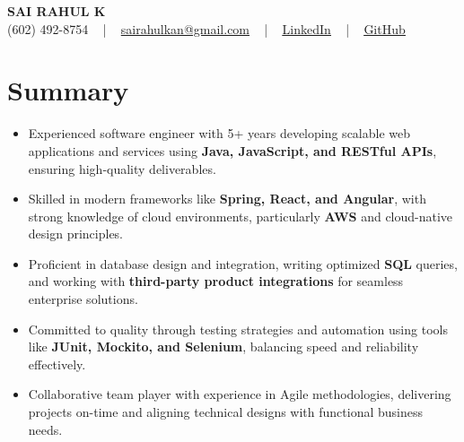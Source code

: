 \documentclass[letterpaper,11pt]{article}
\newcommand{\resumeItem}[1]{
  \item\footnotesize{
    {#1 \vspace{-2pt}}
  }
}
\newcommand{\resumeItemListStart}{\begin{itemize}[leftmargin=*]}
\newcommand{\resumeItemListEnd}{\end{itemize}\vspace{-5pt}}
\begin{document}
\begin{center}
    {\fontsize{14pt}{12pt}\selectfont \textbf{\MakeUppercase{Sai Rahul K}}}\\ \vspace{2pt}
    \fontsize{10pt}{12pt}\selectfont (602) 492-8754 ~ | ~ \href{mailto:sairahulkan@gmail.com}{sairahulkan@gmail.com} ~ | ~
    \href{https://www.linkedin.com/in/rq123/}{\color{blue}\underline{LinkedIn}} ~ | ~
    \href{https://github.com/kanrahuldo}{\color{blue}\underline{GitHub}}~
    \vspace{-8pt}
\end{center}

\section{Summary}
\fontsize{9pt}{10pt}\selectfont
\resumeItemListStart
    \resumeItem{Experienced software engineer with 5+ years developing scalable web applications and services using \textbf{Java, JavaScript, and RESTful APIs}, ensuring high-quality deliverables.}
    \resumeItem{Skilled in modern frameworks like \textbf{Spring, React, and Angular}, with strong knowledge of cloud environments, particularly \textbf{AWS} and cloud-native design principles.}
    \resumeItem{Proficient in database design and integration, writing optimized \textbf{SQL} queries, and working with \textbf{third-party product integrations} for seamless enterprise solutions.}
    \resumeItem{Committed to quality through testing strategies and automation using tools like \textbf{JUnit, Mockito, and Selenium}, balancing speed and reliability effectively.}
    \resumeItem{Collaborative team player with experience in Agile methodologies, delivering projects on-time and aligning technical designs with functional business needs.}
\resumeItemListEnd
\vspace{-6pt}
\end{document}
